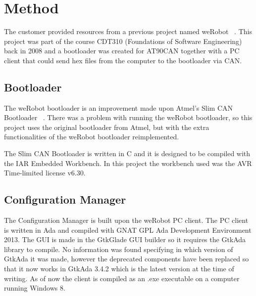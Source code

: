 \section{Method}\label{sec:method}
The customer provided resources from a previous project named weRobot ~\cite{web:werobot}. This project was part of the course CDT310 (Foundations of Software Engineering) back in 2008 and a bootloader was created for AT90CAN together with a PC client that could send hex files from the computer to the bootloader via CAN.


\subsection{Bootloader}
The weRobot bootloader is an improvement made upon Atmel's Slim CAN Bootloader ~\cite{web:slimbootloader}. There was a problem with running the weRobot bootloader, so this project uses the original bootloader from Atmel, but with the extra functionalities of the weRobot bootloader reimplemented.

The Slim CAN Bootloader is written in C and it is designed to be compiled with the IAR Embedded Workbench. In this project the workbench used was the AVR Time-limited license v6.30.

\subsection{Configuration Manager}
The Configuration Manager is built upon the weRobot PC client. The PC client is written in Ada and compiled with GNAT GPL Ada Development Environment 2013.
The GUI is made in the GtkGlade GUI builder so it requires the GtkAda ~\cite{web:gtkada} library to compile. No information was found specifying in which version of GtkAda it was made, however the deprecated components have been replaced so that it now works in GtkAda 3.4.2 which is the latest version at the time of writing. As of now the client is compiled as an .exe executable on a computer running Windows 8.
